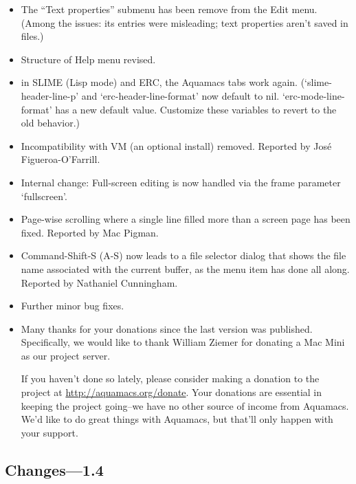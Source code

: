 \begin{itemize}
\item The ``Text properties'' submenu has been remove from the Edit menu.  (Among the issues: its entries were misleading; text properties aren't saved in files.)

\item Structure of Help menu revised.

\item in SLIME (Lisp mode) and ERC, the Aquamacs tabs work again. (`slime-header-line-p' and `erc-header-line-format' now default to nil. `erc-mode-line-format' has a new default value. Customize these variables to revert to the old behavior.)

\item Incompatibility with VM (an optional install)  removed.
Reported by José Figueroa-O'Farrill.

\item Internal change: Full-screen editing is now handled via the
  frame parameter `fullscreen'.

\item Page-wise scrolling where a single line filled more than a screen page has been fixed.
Reported by Mac Pigman.

\item Command-Shift-S (A-S) now leads to a file selector dialog that shows the file name associated with the current buffer, as the menu item has done all along.
Reported by Nathaniel Cunningham.

\item Further minor bug fixes.

\item Many thanks for your donations since the last version was published.  Specifically, we would like to thank William Ziemer for donating a Mac Mini as our project server.

If you haven't done so lately, please consider making a donation to the project at \url{http://aquamacs.org/donate}. Your donations are essential in keeping the project going--we have no other source of income from Aquamacs.  We'd like to do great things with Aquamacs, but that'll only happen with your support.



\end{itemize}

\subsection{Changes---1.4}

